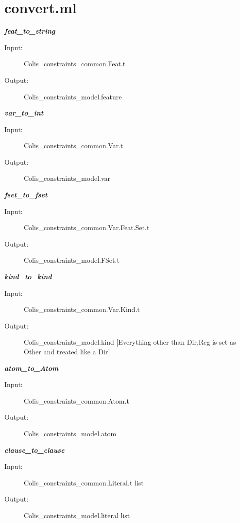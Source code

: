 \documentclass[12pt]{article}
\begin{document}
\section{convert.ml}
\begin{description}


\item \textbf{\textit{feat\_to\_string}}
\begin{description}
    \item[Input:] Colis\_constraints\_common.Feat.t
    \item[Output:] Colis\_constraints\_model.feature
\end{description}

\item \textbf{\textit{var\_to\_int}}
\begin{description}
    \item[Input:] Colis\_constraints\_common.Var.t
    \item[Output:] Colis\_constraints\_model.var
\end{description}

\item \textbf{\textit{fset\_to\_fset}}
\begin{description}
    \item[Input:] Colis\_constraints\_common.Var.Feat.Set.t
    \item[Output:] Colis\_constraints\_model.FSet.t
\end{description}

\item \textbf{\textit{kind\_to\_kind}}
\begin{description}
    \item[Input:] Colis\_constraints\_common.Var.Kind.t
    \item[Output:] Colis\_constraints\_model.kind [Everything other than Dir,Reg is set as Other and treated like a Dir]
\end{description}

\item \textbf{\textit{atom\_to\_Atom}}
\begin{description}
    \item[Input:] Colis\_constraints\_common.Atom.t
    \item[Output:] Colis\_constraints\_model.atom
\end{description}

\item \textbf{\textit{clause\_to\_clause}}
\begin{description}
    \item[Input:] Colis\_constraints\_common.Literal.t list
    \item[Output:] Colis\_constraints\_model.literal list
\end{description}

\end{description}
\end{document}

